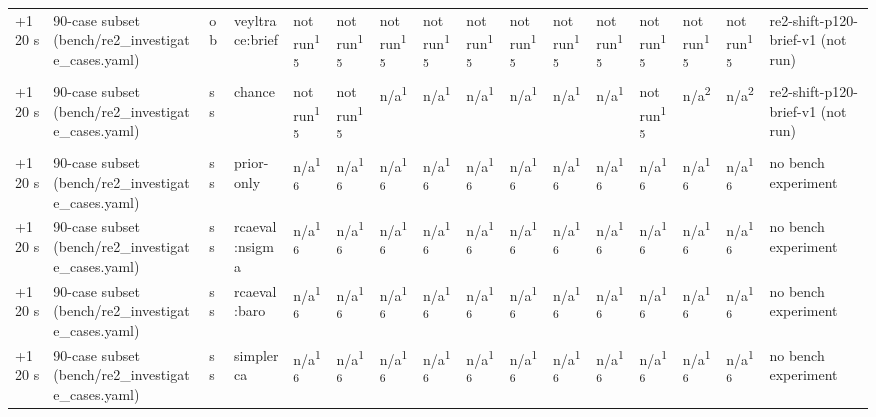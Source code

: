 \begin{table}[t]
\begin{tabular}{llllllllllllllll}
+120 s & 90-case subset (bench/re2\_investigate\_cases.yaml) & ob & veyltrace:brief & not run\textsuperscript{15} & not run\textsuperscript{15} & not run\textsuperscript{15} & not run\textsuperscript{15} & not run\textsuperscript{15} & not run\textsuperscript{15} & not run\textsuperscript{15} & not run\textsuperscript{15} & not run\textsuperscript{15} & not run\textsuperscript{15} & not run\textsuperscript{15} & re2-shift-p120-brief-v1 (not run) \\
+120 s & 90-case subset (bench/re2\_investigate\_cases.yaml) & ss & chance & not run\textsuperscript{15} & not run\textsuperscript{15} & n/a\textsuperscript{1} & n/a\textsuperscript{1} & n/a\textsuperscript{1} & n/a\textsuperscript{1} & n/a\textsuperscript{1} & n/a\textsuperscript{1} & not run\textsuperscript{15} & n/a\textsuperscript{2} & n/a\textsuperscript{2} & re2-shift-p120-brief-v1 (not run) \\
+120 s & 90-case subset (bench/re2\_investigate\_cases.yaml) & ss & prior-only & n/a\textsuperscript{16} & n/a\textsuperscript{16} & n/a\textsuperscript{16} & n/a\textsuperscript{16} & n/a\textsuperscript{16} & n/a\textsuperscript{16} & n/a\textsuperscript{16} & n/a\textsuperscript{16} & n/a\textsuperscript{16} & n/a\textsuperscript{16} & n/a\textsuperscript{16} & no bench experiment \\
+120 s & 90-case subset (bench/re2\_investigate\_cases.yaml) & ss & rcaeval:nsigma & n/a\textsuperscript{16} & n/a\textsuperscript{16} & n/a\textsuperscript{16} & n/a\textsuperscript{16} & n/a\textsuperscript{16} & n/a\textsuperscript{16} & n/a\textsuperscript{16} & n/a\textsuperscript{16} & n/a\textsuperscript{16} & n/a\textsuperscript{16} & n/a\textsuperscript{16} & no bench experiment \\
+120 s & 90-case subset (bench/re2\_investigate\_cases.yaml) & ss & rcaeval:baro & n/a\textsuperscript{16} & n/a\textsuperscript{16} & n/a\textsuperscript{16} & n/a\textsuperscript{16} & n/a\textsuperscript{16} & n/a\textsuperscript{16} & n/a\textsuperscript{16} & n/a\textsuperscript{16} & n/a\textsuperscript{16} & n/a\textsuperscript{16} & n/a\textsuperscript{16} & no bench experiment \\
+120 s & 90-case subset (bench/re2\_investigate\_cases.yaml) & ss & simplerca & n/a\textsuperscript{16} & n/a\textsuperscript{16} & n/a\textsuperscript{16} & n/a\textsuperscript{16} & n/a\textsuperscript{16} & n/a\textsuperscript{16} & n/a\textsuperscript{16} & n/a\textsuperscript{16} & n/a\textsuperscript{16} & n/a\textsuperscript{16} & n/a\textsuperscript{16} & no bench experiment \\

\end{tabular}
\end{table}
